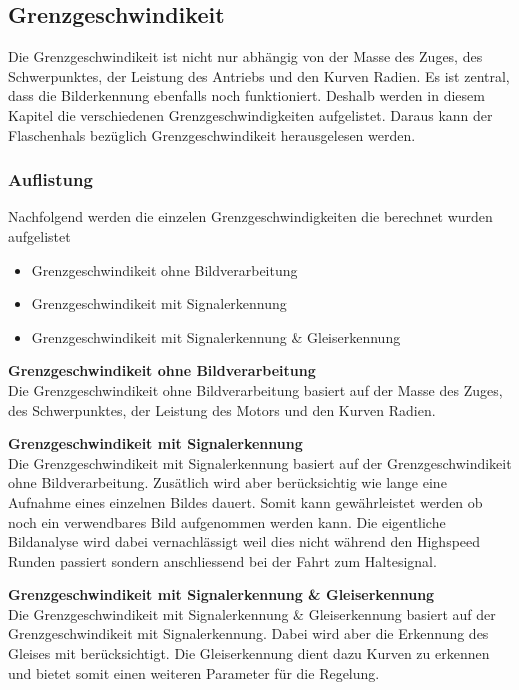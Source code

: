 \documentclass[../../main.tex]{subfiles}
\begin{document}
\subsection{Grenzgeschwindikeit}
Die Grenzgeschwindikeit ist nicht nur abhängig von der Masse des Zuges, des Schwerpunktes, der Leistung des Antriebs und den Kurven Radien.
Es ist zentral, dass die Bilderkennung ebenfalls noch funktioniert. Deshalb werden in diesem Kapitel die verschiedenen Grenzgeschwindigkeiten aufgelistet.
Daraus kann der Flaschenhals bezüglich Grenzgeschwindikeit herausgelesen werden.

\subsubsection{Auflistung}
Nachfolgend werden die einzelen Grenzgeschwindigkeiten die berechnet wurden aufgelistet
\begin{itemize} %
    \item Grenzgeschwindikeit ohne Bildverarbeitung
    \item Grenzgeschwindikeit mit Signalerkennung
    \item Grenzgeschwindikeit mit Signalerkennung \& Gleiserkennung
\end{itemize}

\textbf{Grenzgeschwindikeit ohne Bildverarbeitung} \\
Die Grenzgeschwindikeit ohne Bildverarbeitung basiert auf der Masse des Zuges, des Schwerpunktes, der Leistung des Motors und den Kurven Radien.

\textbf{Grenzgeschwindikeit mit Signalerkennung} \\
Die Grenzgeschwindikeit mit Signalerkennung basiert auf der Grenzgeschwindikeit ohne Bildverarbeitung. Zusätlich wird aber berücksichtig wie lange eine
Aufnahme eines einzelnen Bildes dauert. Somit kann gewährleistet werden ob noch ein verwendbares Bild aufgenommen werden kann. Die eigentliche Bildanalyse
wird dabei vernachlässigt weil dies nicht während den Highspeed Runden passiert sondern anschliessend bei der Fahrt zum Haltesignal.

\textbf{Grenzgeschwindikeit mit Signalerkennung \& Gleiserkennung} \\
Die Grenzgeschwindikeit mit Signalerkennung \& Gleiserkennung basiert auf der Grenzgeschwindikeit mit Signalerkennung. Dabei wird aber die Erkennung des Gleises
mit berücksichtigt. Die Gleiserkennung dient dazu Kurven zu erkennen und bietet somit einen weiteren Parameter für die Regelung.
\end{document}
